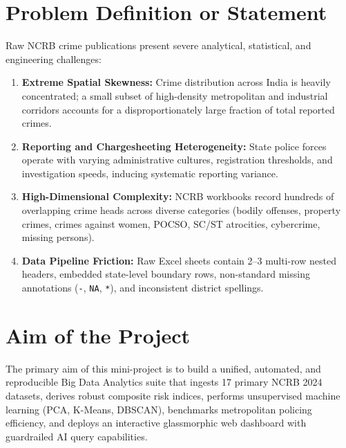 \documentclass[12pt,a4paper]{report}
\begin{document}
\section{Problem Definition or Statement}
Raw NCRB crime publications present severe analytical, statistical, and engineering challenges:
\begin{enumerate}[leftmargin=*]
    \item \textbf{Extreme Spatial Skewness:} Crime distribution across India is heavily concentrated; a small subset of high-density metropolitan and industrial corridors accounts for a disproportionately large fraction of total reported crimes.
    \item \textbf{Reporting and Chargesheeting Heterogeneity:} State police forces operate with varying administrative cultures, registration thresholds, and investigation speeds, inducing systematic reporting variance.
    \item \textbf{High-Dimensional Complexity:} NCRB workbooks record hundreds of overlapping crime heads across diverse categories (bodily offenses, property crimes, crimes against women, POCSO, SC/ST atrocities, cybercrime, missing persons).
    \item \textbf{Data Pipeline Friction:} Raw Excel sheets contain 2--3 multi-row nested headers, embedded state-level boundary rows, non-standard missing annotations (\texttt{-}, \texttt{NA}, \texttt{*}), and inconsistent district spellings.
\end{enumerate}

\section{Aim of the Project}
The primary aim of this mini-project is to build a unified, automated, and reproducible Big Data Analytics suite that ingests 17 primary NCRB 2024 datasets, derives robust composite risk indices, performs unsupervised machine learning (PCA, K-Means, DBSCAN), benchmarks metropolitan policing efficiency, and deploys an interactive glassmorphic web dashboard with guardrailed AI query capabilities.
\end{document}
